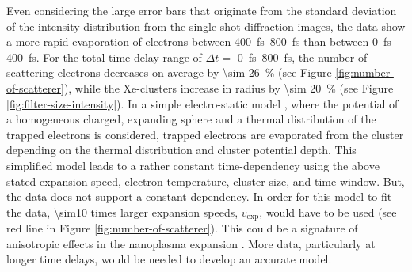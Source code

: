 Even considering the large error bars that originate from the standard deviation of the intensity distribution from the single-shot diffraction images, the data show a more rapid evaporation of electrons between \SIrange{400}{800}{\femto\second} than between \SIrange{0}{400}{\femto\second}. For the total time delay range of $\Delta t=$ \SIrange{0}{800}{\femto\second}, the number of scattering electrons decreases on average by \SI{\sim 26}{\percent} (see Figure \ref{fig:number-of-scatterer}), while the Xe-clusters increase in radius by \SI{\sim 20}{\percent} (see Figure \ref{fig:filter-size-intensity}). In a simple electro-static model \cite{Arbeiter-2010-PRA,Ditmire-1996-PRA}, where the potential of a homogeneous charged, expanding sphere and a thermal distribution of the trapped electrons is considered, trapped electrons are evaporated from the cluster depending on the thermal distribution and cluster potential depth. This simplified model leads to a rather constant time-dependency using the above stated expansion speed, electron temperature, cluster-size, and time window. But, the data does not support a constant dependency. In order for this model to fit the data, \num{\sim10} times larger expansion speeds, $v_{\text{exp}}$, would have to be used (see red line in Figure \ref{fig:number-of-scatterer}). This could be a signature of anisotropic effects in the nanoplasma expansion \cite{Peltz-2014-PRL,Mikaberidze-2009-PRL}. More data, particularly at longer time delays, would be needed to develop an accurate model.\\[1\baselineskip]
%
